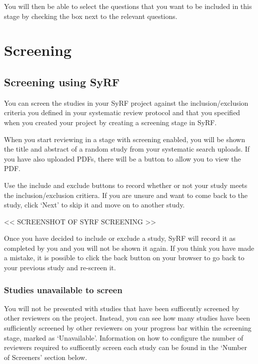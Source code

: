 \documentclass[
]{book}
\begin{document}
You will then be able to select the questions that you want to be included in this stage by checking the box next to the relevant questions.

\hypertarget{projectscreening}{%
\chapter{Screening}\label{projectscreening}}

\hypertarget{screening-using-syrf}{%
\section{Screening using SyRF}\label{screening-using-syrf}}

You can screen the studies in your SyRF project against the inclusion/exclusion criteria you defined in your systematic review protocol and that you specified when you created your project by creating a screening stage in SyRF.

When you start reviewing in a stage with screening enabled, you will be shown the title and abstract of a random study from your systematic search uploads. If you have also uploaded PDFs, there will be a button to allow you to view the PDF.

Use the include and exclude buttons to record whether or not your study meets the inclusion/exclusion critiera. If you are unsure and want to come back to the study, click `Next' to skip it and move on to another study.

\textless{}\textless{} SCREENSHOT OF SYRF SCREENING \textgreater{}\textgreater{}

Once you have decided to include or exclude a study, SyRF will record it as completed by you and you will not be shown it again. If you think you have made a mistake, it is possible to click the back button on your browser to go back to your previous study and re-screen it.

\hypertarget{studies-unavailable-to-screen}{%
\subsection{Studies unavailable to screen}\label{studies-unavailable-to-screen}}

You will not be presented with studies that have been sufficently screened by other reviewers on the project. Instead, you can see how many studies have been sufficiently screened by other reviewers on your progress bar within the screening stage, marked as `Unavailable'. Information on how to configure the number of reviewers required to sufficently screen each study can be found in the `Number of Screeners' section below.
\end{document}
